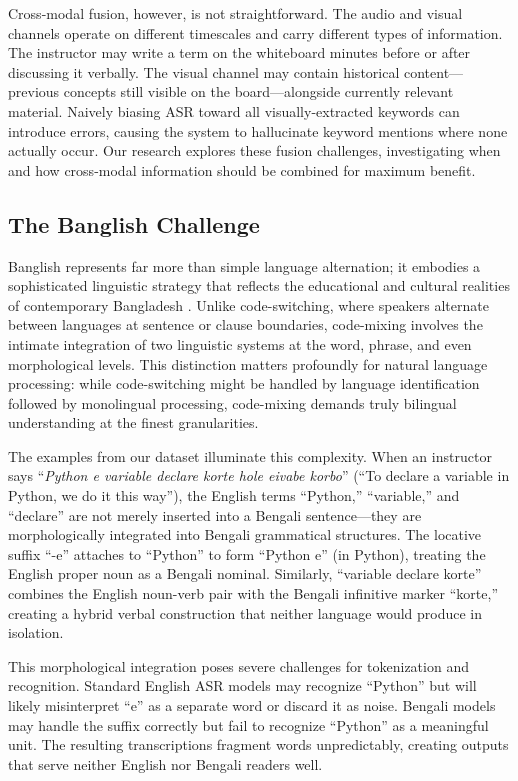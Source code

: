 Cross-modal fusion, however, is not straightforward. The audio and visual channels operate on different timescales and carry different types of information. The instructor may write a term on the whiteboard minutes before or after discussing it verbally. The visual channel may contain historical content---previous concepts still visible on the board---alongside currently relevant material. Naively biasing ASR toward all visually-extracted keywords can introduce errors, causing the system to hallucinate keyword mentions where none actually occur. Our research explores these fusion challenges, investigating when and how cross-modal information should be combined for maximum benefit.

\subsection{The Banglish Challenge}

Banglish represents far more than simple language alternation; it embodies a sophisticated linguistic strategy that reflects the educational and cultural realities of contemporary Bangladesh \cite{MyersScotton1993, Muysken2000}. Unlike code-switching, where speakers alternate between languages at sentence or clause boundaries, code-mixing involves the intimate integration of two linguistic systems at the word, phrase, and even morphological levels. This distinction matters profoundly for natural language processing: while code-switching might be handled by language identification followed by monolingual processing, code-mixing demands truly bilingual understanding at the finest granularities.

The examples from our dataset illuminate this complexity. When an instructor says ``\textit{Python e variable declare korte hole eivabe korbo}'' (``To declare a variable in Python, we do it this way''), the English terms ``Python,'' ``variable,'' and ``declare'' are not merely inserted into a Bengali sentence---they are morphologically integrated into Bengali grammatical structures. The locative suffix ``-e'' attaches to ``Python'' to form ``Python e'' (in Python), treating the English proper noun as a Bengali nominal. Similarly, ``variable declare korte'' combines the English noun-verb pair with the Bengali infinitive marker ``korte,'' creating a hybrid verbal construction that neither language would produce in isolation.

This morphological integration poses severe challenges for tokenization and recognition. Standard English ASR models may recognize ``Python'' but will likely misinterpret ``e'' as a separate word or discard it as noise. Bengali models may handle the suffix correctly but fail to recognize ``Python'' as a meaningful unit. The resulting transcriptions fragment words unpredictably, creating outputs that serve neither English nor Bengali readers well.


